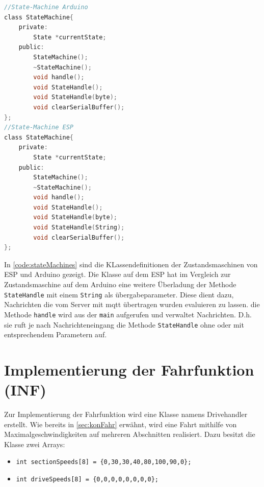 \begin{lstlisting}[language=c, style=dhpaperdefault]
//State-Machine Arduino
class StateMachine{
	private:
		State *currentState;
	public:
		StateMachine();
		~StateMachine();
		void handle();
		void StateHandle();
		void StateHandle(byte);
		void clearSerialBuffer();
};
//State-Machine ESP
class StateMachine{
	private:
		State *currentState;
	public:
		StateMachine();
		~StateMachine();
		void handle();
		void StateHandle();
		void StateHandle(byte);
		void StateHandle(String);
		void clearSerialBuffer();
};
\end{lstlisting}

In \autoref{code:stateMachines} sind die KLassendefinitionen der Zustandsmaschinen von ESP und Arduino gezeigt. Die Klasse auf dem ESP hat im Vergleich zur Zustandsmaschine auf dem Arduino eine weitere Überladung der Methode \texttt{StateHandle} mit einem \texttt{String} als übergabeparameter. Diese dient dazu, Nachrichten die vom Server mit \acrshort{mqtt} übertragen wurden evaluieren zu lassen. die Methode \texttt{handle} wird aus der \texttt{main} aufgerufen und verwaltet Nachrichten. D.h. sie ruft je nach Nachrichteneingang die Methode \texttt{StateHandle} ohne oder mit entsprechendem Parametern auf. 

\chapter{Implementierung der Fahrfunktion (INF)}
Zur Implementierung der Fahrfunktion wird eine Klasse namens Drivehandler erstellt. Wie bereits in \autoref{sec:konFahr} erwähnt, wird eine Fahrt mithilfe von Maximalgeschwindigkeiten auf mehreren Abschnitten realisiert. Dazu besitzt die Klasse zwei Arrays: 

\begin{center}
	\begin{itemize}
		\item \texttt{int sectionSpeeds[8] = \{0,30,30,40,80,100,90,0\};}
		\item \texttt{int driveSpeeds[8] = \{0,0,0,0,0,0,0,0\};}
	\end{itemize}
\end{center}

